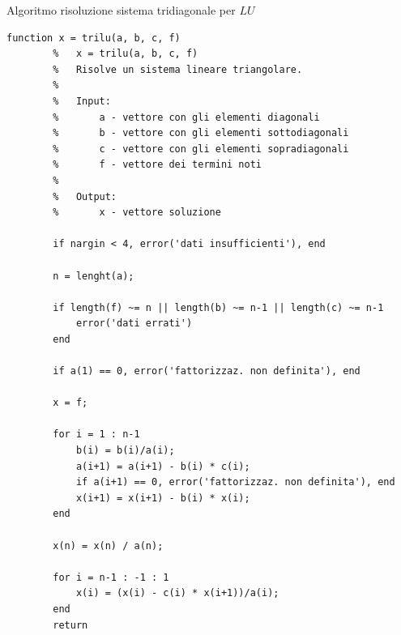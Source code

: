 \begin{algorithm}\caption{Algoritmo risoluzione sistema tridiagonale per $LU$}
	\label{alg:calcolo_sistema_tridiagonale_LU}
	\begin{lstlisting}[style=Matlab-editor]
		function x = trilu(a, b, c, f)
		%	x = trilu(a, b, c, f)
		%	Risolve un sistema lineare triangolare.
		%
		%	Input:
		%		a - vettore con gli elementi diagonali
		%		b - vettore con gli elementi sottodiagonali
		%		c - vettore con gli elementi sopradiagonali
		%		f - vettore dei termini noti
		%
		%	Output:
		%		x - vettore soluzione
		
		if nargin < 4, error('dati insufficienti'), end
		
		n = lenght(a);
		
		if length(f) ~= n || length(b) ~= n-1 || length(c) ~= n-1
			error('dati errati')
		end
		
		if a(1) == 0, error('fattorizzaz. non definita'), end
		
		x = f;
		
		for i = 1 : n-1
			b(i) = b(i)/a(i);
			a(i+1) = a(i+1) - b(i) * c(i);
			if a(i+1) == 0, error('fattorizzaz. non definita'), end
			x(i+1) = x(i+1) - b(i) * x(i);
		end
		
		x(n) = x(n) / a(n);
		
		for i = n-1 : -1 : 1
			x(i) = (x(i) - c(i) * x(i+1))/a(i);
		end
		return
	\end{lstlisting}
\end{algorithm}